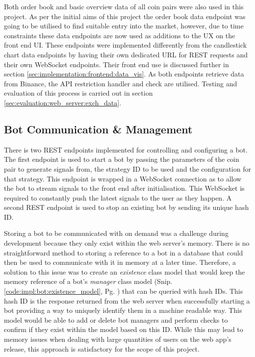Both order book and basic overview data of all coin pairs were also used in this project. As per the initial aims of this project the order book data endpoint was going to be utilised to find suitable entry into the market, however, due to time constraints these data endpoints are now used as additions to the UX on the front end UI. These endpoints were implemented differently from the candlestick chart data endpoints by having their own dedicated URL for REST requests and their own WebSocket endpoints. Their front end use is discussed further in section \ref{sec:implementation:frontend:data_vis}. As both endpoints retrieve data from Binance, the API restriction handler and check are utilised. Testing and evaluation of this process is carried out in section \ref{sec:evaluation:web_server:exch_data}.

\subsection{Bot Communication \& Management}
\label{sec:implementation:info_comm:bot_comm_management}

\noindent There is two REST endpoints implemented for controlling and configuring a bot. The first endpoint is used to start a bot by passing the parameters of the coin pair to generate signals from, the strategy ID to be used and the configuration for that strategy. This endpoint is wrapped in a WebSocket connection as to allow the bot to stream signals to the front end after initialisation. This WebSocket is required to constantly push the latest signals to the user as they happen. A second REST endpoint is used to stop an existing bot by sending its unique hash ID.

Storing a bot to be communicated with on demand was a challenge during development because they only exist within the web server's memory. There is no straightforward method to storing a reference to a bot in a database that could then be used to communicate with it in memory at a later time. Therefore, a solution to this issue was to create an \textit{existence} class model that would keep the memory reference of a bot's \textit{manager} class model (Snip. \ref{code:impl:bot:existence_model}, Pg. \pageref{code:impl:bot:existence_model}) that can be queried with hash IDs. This hash ID is the response returned from the web server when successfully starting a bot providing a way to uniquely identify them in a machine readable way. This model would be able to add or delete bot managers and perform checks to confirm if they exist within the model based on this ID. While this may lead to memory issues when dealing with large quantities of users on the web app's release, this approach is satisfactory for the scope of this project. 

